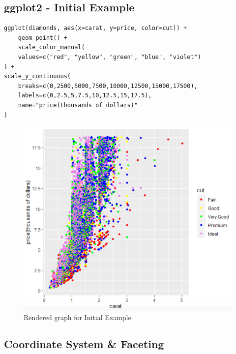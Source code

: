 \documentclass[a4paper]{article}
\begin{document}
		\subsection{ggplot2 - Initial Example}
		
		\begin{lstlisting}
ggplot(diamonds, aes(x=carat, y=price, color=cut)) +
	geom_point() +
	scale_color_manual(
	values=c("red", "yellow", "green", "blue", "violet")
) +
scale_y_continuous(
	breaks=c(0,2500,5000,7500,10000,12500,15000,17500),
	labels=c(0,2.5,5,7.5,10,12.5,15,17.5),
	name="price(thousands of dollars)"
)
		\end{lstlisting}
		
		\begin{figure}[htb!]
			\centering
			\includegraphics[width=.5\textwidth]{img/sw03/example_01.png}
			\caption{Rendered graph for Initial Example}
		\end{figure}
	
		\newpage
		
		\subsection{Coordinate System \& Faceting}
		
\end{document}

